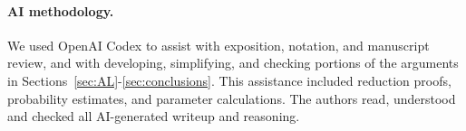\paragraph*{AI methodology.}%
We used OpenAI Codex to assist with exposition, notation, and manuscript review, and with developing, simplifying, and checking portions of the arguments in Sections~\ref{sec:AL}-\ref{sec:conclusions}. This assistance included reduction proofs, probability estimates, and parameter calculations. The authors read, understood and checked all AI-generated writeup and reasoning.
